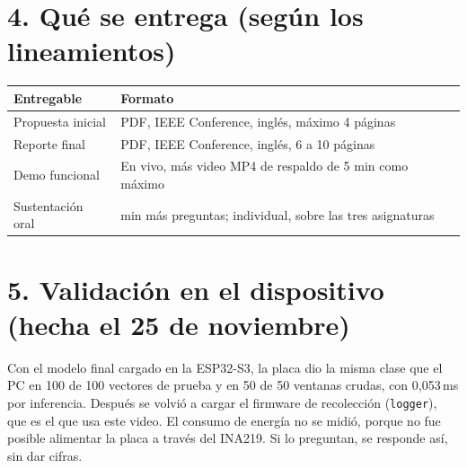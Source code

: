 \documentclass[11pt,a4paper]{article}
\begin{document}
\section*{4. Qu\'e se entrega (seg\'un los lineamientos)}
\begin{tabular}{@{}>{\raggedright}p{3.3cm}>{\raggedright\arraybackslash}p{12cm}@{}}
\toprule
Entregable & Formato \\
\midrule
Propuesta inicial & PDF, IEEE Conference, ingl\'es, m\'aximo 4 p\'aginas \\
Reporte final & PDF, IEEE Conference, ingl\'es, 6 a 10 p\'aginas \\
Demo funcional & En vivo, m\'as video MP4 de respaldo de 5 min como m\'aximo \\
Sustentaci\'on oral & 15 min m\'as preguntas; individual, sobre las tres asignaturas \\
\bottomrule
\end{tabular}

\section*{5. Validaci\'on en el dispositivo (hecha el 25 de noviembre)}
Con el modelo final cargado en la ESP32-S3, la placa dio la misma clase que el PC en 100 de 100 vectores de prueba y en 50 de 50 ventanas crudas, con 0,053\,ms por inferencia. Despu\'es se volvi\'o a cargar el firmware de recolecci\'on (\texttt{logger}), que es el que usa este video.
El consumo de energ\'ia no se midi\'o, porque no fue posible alimentar la placa a trav\'es del INA219. Si lo preguntan, se responde as\'i, sin dar cifras.
\end{document}
